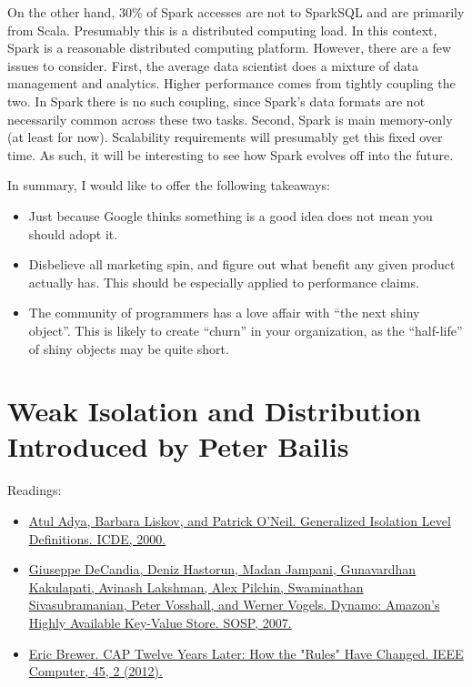 \documentclass[b5paper,11pt,twoside,openright]{book}
\newcommand\Chapter[3]{
  \hypertarget{#1}{
    \chapter[#2]{#2\\{\Large #3}}
  }
}
\begin{document}
On the other hand, 30\% of Spark accesses are not to SparkSQL and are
primarily from Scala. Presumably this is a distributed computing load.
In this context, Spark is a reasonable distributed computing platform.
However, there are a few issues to consider. First, the average data
scientist does a mixture of data management and analytics. Higher
performance comes from tightly coupling the two. In Spark there is no
such coupling, since Spark's data formats are not necessarily common
across these two tasks. Second, Spark is main memory-only (at least for
now). Scalability requirements will presumably get this fixed over time.
As such, it will be interesting to see how Spark evolves off into the
future.

In summary, I would like to offer the following takeaways:

\begin{itemize}
  \item
  Just because Google thinks something is a good idea does not mean you
  should adopt it.
  \item
  Disbelieve all marketing spin, and figure out what benefit any given
  product actually has. This should be especially applied to performance
  claims.
  \item
  The community of programmers has a love affair with ``the next shiny
  object''. This is likely to create ``churn'' in your organization, as
  the ``half-life'' of shiny objects may be quite short.
\end{itemize}


\Chapter{ch6-isolation}{%
Weak Isolation and Distribution
}{%
Introduced by Peter Bailis
}

\begin{framed}
Readings:
\begin{itemize}
\item
\href{https://scholar.google.com/scholar?cluster=12975897967422539576}{Atul
  Adya, Barbara Liskov, and Patrick O'Neil. {Generalized Isolation Level
    Definitions}. {ICDE}, 2000.}
\item
\href{https://scholar.google.com/scholar?cluster=5432858092023181552}{Giuseppe
  DeCandia, Deniz Hastorun, Madan Jampani, Gunavardhan Kakulapati, Avinash
  Lakshman, Alex Pilchin, Swaminathan Sivasubramanian, Peter Vosshall, and
  Werner Vogels. {Dynamo: Amazon's Highly Available Key-Value Store}.
  {SOSP}, 2007.}
\item
\href{https://scholar.google.com/scholar?cluster=17642052422667212790}{Eric
  Brewer. {CAP Twelve Years Later: How the "Rules" Have Changed}. {IEEE
    Computer}, 45, 2 (2012).}
\end{itemize}
\end{framed}
\end{document}
